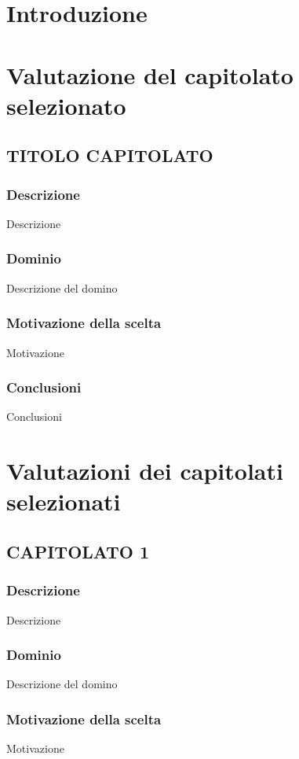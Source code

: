 \section{Introduzione}

\section{Valutazione del capitolato selezionato}
\subsection{TITOLO CAPITOLATO}

\subsubsection{Descrizione}
Descrizione
\subsubsection{Dominio}
Descrizione del domino

\subsubsection{Motivazione della scelta}
Motivazione
\subsubsection{Conclusioni}
Conclusioni

\section{Valutazioni dei capitolati selezionati}

\subsection{CAPITOLATO 1}

\subsubsection{Descrizione}
Descrizione
\subsubsection{Dominio}
Descrizione del domino

\subsubsection{Motivazione della scelta}
Motivazione

